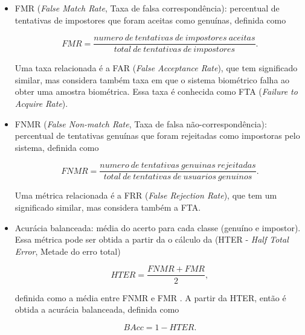 \begin{itemize}
    \item FMR (\textit{False Match Rate}, Taxa de falsa correspondência): percentual de tentativas de impostores que foram aceitas como genuínas, definida como

          \begin{equation}
              \label{eqn:fmr}
              FMR = \frac{numero\:de\:tentativas\:de\:impostores\:aceitas}{total\:de\:tentativas\:de\:impostores}.
          \end{equation}

          Uma taxa relacionada é a FAR (\textit{False Acceptance Rate}), que tem significado similar, mas considera também taxa em que o sistema biométrico falha ao obter uma amostra biométrica. Essa taxa é conhecida como FTA (\textit{Failure to Acquire Rate}).


    \item FNMR (\textit{False Non-match Rate}, Taxa de falsa não-correspondência): percentual de tentativas genuínas que foram rejeitadas como impostoras pelo sistema, definida como

          \begin{equation}
              \label{eqn:fnmr}
              FNMR = \frac{numero\:de\:tentativas\:genuinas\:rejeitadas}{total\:de\:tentativas\:de\:usuarios\:genuinos}.
          \end{equation}

          Uma métrica relacionada é a FRR (\textit{False Rejection Rate}), que tem um significado similar, mas considera também a FTA.

    \item Acurácia balanceada: média do acerto para cada classe (genuíno e impostor). Essa métrica pode ser obtida a partir da o cálculo da (HTER - \textit{Half Total Error}, Metade do erro total)

          \begin{equation}
              \label{eqn:hter}
              HTER = \frac{FNMR + FMR}{2},
          \end{equation}

          definida como a média entre FNMR e FMR \cite{Roy2022systematic}. A partir da HTER, então é obtida a acurácia balanceada, definida como

          \begin{equation}
              \label{eqn:bacc}
              BAcc = 1 - HTER.
          \end{equation}

\end{itemize}


